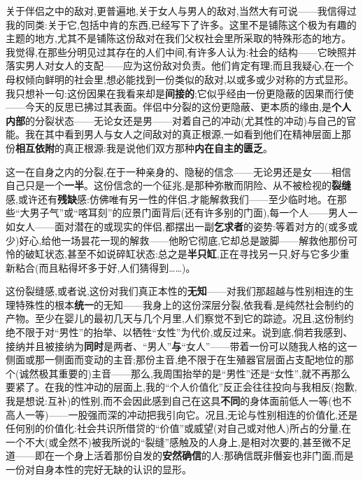 关于伴侣之中的敌对,更普遍地,关于女人与男人的敌对,当然大有可说——我信得过我的同类:关于它,包括中肯的东西,已经写下了许多。这里不是铺陈这个极为有趣的主题的地方,尤其不是铺陈这份敌对在我们父权社会里所采取的特殊形态的地方。我觉得,在那些分明见过其存在的人们中间,有许多人认为:社会的结构——它映照并落实男人对女人的支配——应为这份敌对负责。他们肯定有理;而且我疑心,在一个母权倾向鲜明的社会里,想必能找到一份类似的敌对,以或多或少对称的方式显形。我只想补一句:这份因果在我看来却是\textbf{间接的};它似乎经由一份更隐蔽的因果而行使——今天的反思已拂过其表面。伴侣中分裂的这份更隐蔽、更本质的缘由,是\textbf{个人内部}的分裂状态——无论女还是男——对着自己的冲动(尤其性的冲动)与自己的官能。我在其中看到男人与女人之间敌对的真正根源,一如看到他们在精神层面上那份\textbf{相互依附}的真正根源:我是说他们双方那种\textbf{内在自主的匮乏}\dmark{}。

这一在自身之内的分裂,在于一种亲身的、隐秘的信念——无论男还是女——相信自己只是一个\textbf{一半}。这份信念的一个征兆,是那种弥散而阴险、从不被检视的\textbf{裂缝}感,或许还有\textbf{残缺}感:仿佛唯有另一性的伴侣,才能解救我们——至少临时地。在那些“大男子气”或“喀耳刻”的应景门面背后(还有许多别的门面),每一个人——男人一如女人——面对潜在的或现实的伴侣,都摆出一副\textbf{乞求者}的姿势:等着对方的(或多或少)好心,给他一场昙花一现的解救——他盼它彻底,它却总是跛脚——解救他那份可怜的破缸状态,甚至不如说碎缸状态:总之是\textbf{半只缸},正在寻找另一只,好与它多少重新粘合(而且粘得坏多于好,人们猜得到……)。

这份裂缝感,或者说,这份对我们真正本性的\textbf{无知}——对我们那超越与性别相连的生理特殊性的根本\textbf{统一}的无知——我身上的这份深层分裂,依我看,是纯然社会制约的产物。至少在婴儿的最初几天与几个月里,人们察觉不到它的踪迹。况且,这份制约绝不限于对“男性”的抬举、以牺牲“女性”为代价,或反过来。说到底,倘若我感到、接纳并且被接纳为\textbf{同时}是两者、“男人”\textbf{与}“女人”——带着一份可以随我人格的这一侧面或那一侧面而变动的主音;那份主音,绝不限于在生殖器官层面占支配地位的那个(诚然极其重要的)主音——那么,我周围抬举的是“男性”还是“女性”,就不再那么要紧了。在我的性冲动的层面上,我的“个人价值化”反正会往往投向与我相反(抱歉,我是想说:互补)的性别,而不会因此感到自己在这具\textbf{不同}的身体面前低人一等(也不高人一等)——一股强而深的冲动把我引向它。况且,无论与性别相连的价值化,还是任何别的价值化:社会共识所借贷的“价值”或威望(对自己或对他人)所占的分量,在一个不大(或全然不)被我所说的“裂缝”感触及的人身上,是相对次要的,甚至微不足道——即在一个身上活着那份自发的\textbf{安然确信}的人:那确信既非僭妄也非门面,而是一份对自身本性的完好无缺的认识的显形。\dmark{}

